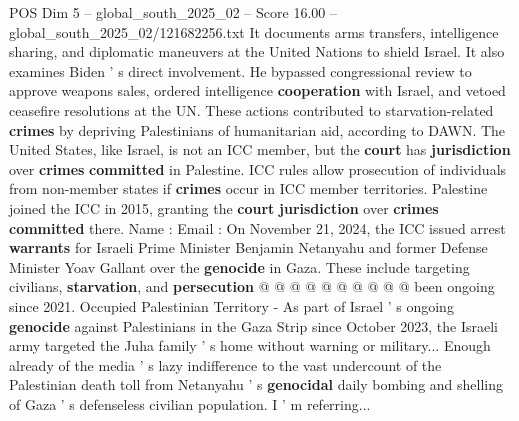 \begin{textsample}{POS Dim 5 – global\_south\_2025\_02 – Score 16.00 – global\_south\_2025\_02/121682256.txt}
It documents arms transfers, intelligence sharing, and diplomatic maneuvers at the United Nations to shield Israel.
It also examines Biden ' s direct involvement.
He bypassed congressional review to approve weapons sales, ordered intelligence \textbf{cooperation} with Israel, and vetoed ceasefire resolutions at the UN.
These actions contributed to starvation-related \textbf{crimes} by depriving Palestinians of humanitarian aid, according to DAWN.
The United States, like Israel, is not an ICC member, but the \textbf{court} has \textbf{jurisdiction} over \textbf{crimes} \textbf{committed} in Palestine.
ICC rules allow prosecution of individuals from non-member states if \textbf{crimes} occur in ICC member territories.
Palestine joined the ICC in 2015, granting the \textbf{court} \textbf{jurisdiction} over \textbf{crimes} \textbf{committed} there.
Name : Email : On November 21, 2024, the ICC issued arrest \textbf{warrants} for Israeli Prime Minister Benjamin Netanyahu and former Defense Minister Yoav Gallant over the \textbf{genocide} in Gaza.
These include targeting civilians, \textbf{starvation}, and \textbf{persecution} @ @ @ @ @ @ @ @ @ @ been ongoing since 2021.
Occupied Palestinian Territory - As part of Israel ' s ongoing \textbf{genocide} against Palestinians in the Gaza Strip since October 2023, the Israeli army targeted the Juha family ' s home without warning or military...
Enough already of the media ' s lazy indifference to the vast undercount of the Palestinian death toll from Netanyahu ' s \textbf{genocidal} daily bombing and shelling of Gaza ' s defenseless civilian population.
I ' m referring...

\end{textsample}
